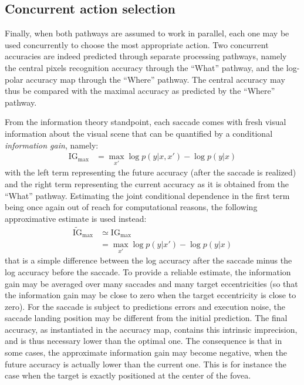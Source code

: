 \subsection{Concurrent action selection}
\label{sec:IG}
%
Finally, when both pathways are assumed to work in parallel, each one may be used concurrently to choose the most appropriate action. Two concurrent accuracies are indeed  predicted through separate processing pathways, namely the central pixels recognition accuracy through the ``What'' pathway, and the log-polar accuracy map through the ``Where'' pathway. The central accuracy may thus be compared with the maximal accuracy as predicted by the ``Where'' pathway.

From the information theory standpoint, each saccade comes with fresh visual information about the visual scene that can be quantified by a conditional \emph{information gain}, namely:
\begin{align}
\text{IG}_\text{max} &= \max_{x'} \log p(y|x,x') - \log p(y|x)\nonumber
\end{align}
with the left term representing the future accuracy (after the saccade is realized) and the right term representing the current accuracy as it is obtained from the ``What'' pathway.
Estimating the joint conditional dependence in the first term being once again out of reach for computational reasons, the following approximative estimate is used instead: %
\begin{align}
\tilde{\text{IG}}_\text{max}&\simeq \text{IG}_\text{max}\nonumber\\
&=\max_{x'} \log p(y|x') - \log p(y|x)\label{eq:IG}
\end{align}
that is a simple difference between the log accuracy after the saccade minus the log accuracy before the saccade.
To provide a reliable estimate, the information gain may be averaged over many saccades and many target eccentricities (so that the information gain may be close to zero when the target eccentricity is close to zero).
For the saccade is subject to predictions errors and execution noise, the saccade landing position may be different from the initial prediction. The final accuracy, as instantiated in the accuracy map, contains this intrinsic imprecision, and is thus necessary lower than the optimal one. The consequence is that in some cases, the approximate information gain may become negative, when the future accuracy is actually lower than the current one. This is for instance the case when the target is exactly positioned at the center of the fovea.
